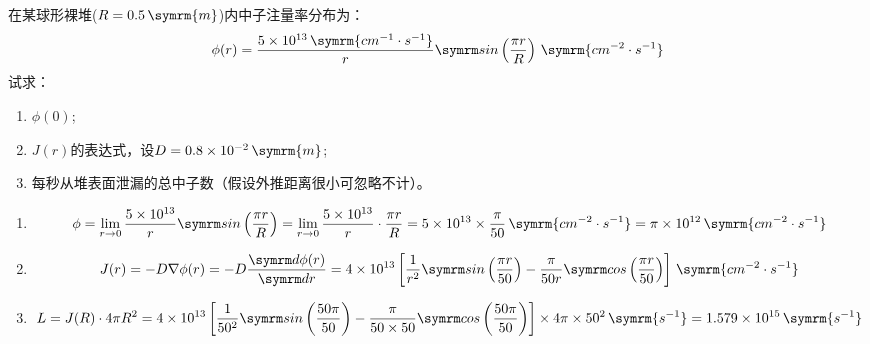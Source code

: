 \begin{exercise}
    在某球形裸堆($R=0.5\,\symrm{m}$)内中子注量率分布为：
    \begin{equation*}
        \phi(r) = \frac{5\times 10^{13}\,\symrm{cm^{-1}\cdot s^{-1}}}{r} \nsin \left(\frac{\pi r}{R}\right)\,\symrm{cm^{-2}\cdot s^{-1}}
    \end{equation*}
    试求：
    \begin{enumerate}[(1)]
        \item $\phi(0)$;
        \item $J(r)$的表达式，设$D = 0.8\times 10^{-2}\,\symrm{m}$;
        \item 每秒从堆表面泄漏的总中子数（假设外推距离很小可忽略不计）。
    \end{enumerate}
    \begin{solution}
        \begin{enumerate}[(1)]
            \item \begin{equation*}
                \phi = \lim_{r\to 0} \frac{5\times 10^{13}}{r} \nsin \left(\frac{\pi r}{R}\right) = \lim_{r\to 0} \frac{5\times 10^{13}}{r} \cdot \frac{\pi r}{R} = 5\times 10^{13} \times \frac{\pi}{50}\,\symrm{cm^{-2}\cdot s^{-1}} = \pi \times 10^{12}\,\symrm{cm^{-2}\cdot s^{-1}}
            \end{equation*}
            \item \begin{equation*}
                J(r) = -D\nabla \phi(r) = -D \dv{\phi(r)}{r} = 4\times 10^{13} \left[\frac{1}{r^2}\nsin \left(\frac{\pi r}{50}\right) - \frac{\pi}{50 r} \ncos\left(\frac{\pi r}{50}\right)\right]\,\symrm{cm^{-2}\cdot s^{-1}}
            \end{equation*}
            \item \begin{equation*}
                L = J(R)\cdot 4\pi R^2 = 4\times 10^{13} \left[\frac{1}{50^2}\nsin \left(\frac{50 \pi}{50}\right) - \frac{\pi}{50 \times 50} \ncos\left(\frac{50\pi}{50}\right)\right]\times 4\pi\times 50^2 \,\symrm{s^{-1}} = 1.579\times 10^{15}\,\symrm{s^{-1}}
            \end{equation*}
        \end{enumerate}
    \end{solution}
\end{exercise}

